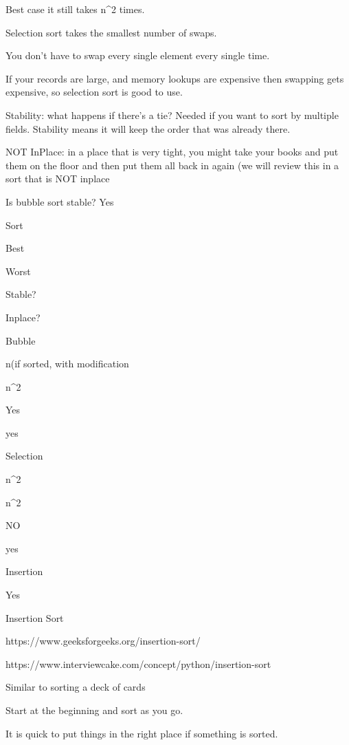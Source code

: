 Best case it still takes n^2 times. 

Selection sort takes the smallest number of swaps.  

You don't have to swap every single element every single time. 

If your records are large, and memory lookups are expensive then swapping gets expensive, so selection sort is good to use. 

 

 

Stability: what happens if there's a tie? Needed if you want to sort by multiple fields. Stability means it will keep the order that was already there. 

 

NOT InPlace: in a place that is very tight, you might take your books and put them on the floor and then put them all back in again (we will review this in a sort that is NOT inplace 

 

Is bubble sort stable? Yes 

 

Sort 

Best 

Worst 

Stable? 

Inplace? 

Bubble 

n(if sorted, with modification 

n^2 

Yes 

yes 

Selection 

n^2 

n^2 

NO 

yes 

Insertion 

 

 

Yes 

 

 

Insertion Sort 

https://www.geeksforgeeks.org/insertion-sort/ 

https://www.interviewcake.com/concept/python/insertion-sort  

Similar to sorting a deck of cards 

Start at the beginning and sort as you go. 

It is quick to put things in the right place if something is sorted. 

